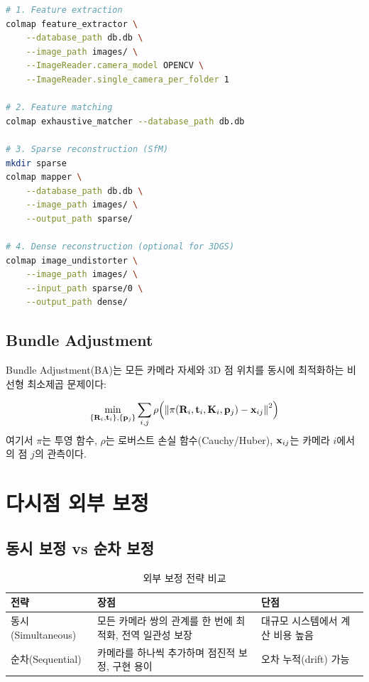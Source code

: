 \documentclass[11pt, a4paper]{report}
\begin{document}
\begin{codebox}[title={COLMAP CLI 사용법}]
\begin{lstlisting}[language=bash]
# 1. Feature extraction
colmap feature_extractor \
    --database_path db.db \
    --image_path images/ \
    --ImageReader.camera_model OPENCV \
    --ImageReader.single_camera_per_folder 1

# 2. Feature matching
colmap exhaustive_matcher --database_path db.db

# 3. Sparse reconstruction (SfM)
mkdir sparse
colmap mapper \
    --database_path db.db \
    --image_path images/ \
    --output_path sparse/

# 4. Dense reconstruction (optional for 3DGS)
colmap image_undistorter \
    --image_path images/ \
    --input_path sparse/0 \
    --output_path dense/
\end{lstlisting}
\end{codebox}

\subsection{Bundle Adjustment}

Bundle Adjustment(BA)는 모든 카메라 자세와 3D 점 위치를 동시에 최적화하는 비선형 최소제곱 문제이다:

\begin{equation}
  \min_{\{\mathbf{R}_i, \mathbf{t}_i\}, \{\mathbf{p}_j\}} \sum_{i,j} \rho\!\left(\left\| \pi(\mathbf{R}_i, \mathbf{t}_i, \mathbf{K}_i, \mathbf{p}_j) - \mathbf{x}_{ij} \right\|^2\right)
\end{equation}
여기서 $\pi$는 투영 함수, $\rho$는 로버스트 손실 함수(Cauchy/Huber), $\mathbf{x}_{ij}$는 카메라 $i$에서의 점 $j$의 관측이다.

\section{다시점 외부 보정}

\subsection{동시 보정 vs 순차 보정}

\begin{table}[H]
\centering
\caption{외부 보정 전략 비교}
\begin{tabularx}{\textwidth}{lXX}
\toprule
\textbf{전략} & \textbf{장점} & \textbf{단점} \\
\midrule
동시(Simultaneous) & 모든 카메라 쌍의 관계를 한 번에 최적화, 전역 일관성 보장 & 대규모 시스템에서 계산 비용 높음 \\
순차(Sequential) & 카메라를 하나씩 추가하며 점진적 보정, 구현 용이 & 오차 누적(drift) 가능 \\
\bottomrule
\end{tabularx}
\end{table}
\end{document}
